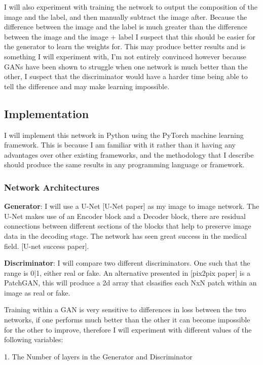 \documentclass{UoYCSproject}
\begin{document}
I will also experiment with training the network to output the composition of the image and the label, and then manually subtract the image after. Because the difference between the image and the label is much greater than the difference between the image and the image + label I suspect that this should be easier for the generator to learn the weights for. This may produce better results and is something I will experiment with, I'm not entirely convinced however because GANs have been shown to struggle when one network is much better than the other, I suspect that the discriminator would have a harder time being able to tell the difference and may make learning impossible. 

\subsection{Implementation}

I will implement this network in Python using the PyTorch machine learning framework. This is because I am familiar with it rather than it having any advantages over other existing frameworks, and the methodology that I describe should produce the same results in any programming language or framework.

\subsubsection{Network Architectures}

\textbf{Generator}: I will use a U-Net [U-Net paper] as my image to image network. The U-Net makes use of an Encoder block and a Decoder block, there are residual connections between different sections of the blocks that help to preserve image data in the decoding stage. The network has seen great success in the medical field. [U-net success paper].

\textbf{Discriminator}: I will compare two different discriminators. One such that the range is {0|1}, either real or fake. An alternative presented in [pix2pix paper] is a PatchGAN, this will produce a 2d array that clsasifies each NxN patch within an image as real or fake.

Training within a GAN is very sensitive to differences in loss between the two networks, if one performs much better than the other it can become impossible for the other to improve, therefore I will experiment with different values of the following variables:

1. The Number of layers in the Generator and Discriminator
\end{document}

